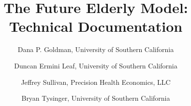 \title{The Future Elderly Model: Technical Documentation}
\author{
Dana P. Goldman, University of Southern California\\
\and Duncan Ermini Leaf, University of Southern California
\and Jeffrey Sullivan, Precision Health Economics, LLC\\
\and Bryan Tysinger, University of Southern California\\
}
